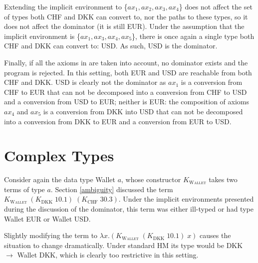 Extending the implicit environment to \{$ax_1,ax_2,ax_3,ax_4$\} does not affect the set of types both CHF and DKK can convert to, nor the paths to these types, so it does not affect the dominator (it is still EUR). Under the assumption that the implicit environment is \{$ax_1,ax_3,ax_4,ax_5$\}, there is once again a single type both CHF and DKK can convert to: USD. As such, USD is the dominator.

Finally, if all the axioms in  are taken into account, no dominator exists and the program is rejected. In this setting, both EUR and USD are reachable from both CHF and DKK. USD is clearly not the dominator as $ax_1$ is a conversion from CHF to EUR that can not be decomposed into a conversion from CHF to USD and a conversion from USD to EUR; neither is EUR: the composition of axioms $ax_4$ and $ax_5$ is a conversion from DKK into USD that can not be decomposed into a conversion from DKK to EUR and a conversion from EUR to USD.


\section{Complex Types}
\label{complex types}
Consider again the data type Wallet $a$, whose constructor \textsc{$K_{\text{Wallet}}$} takes two terms of type $a$. Section \ref{ambiguity} discussed the term \textsc{$K_{\text{Wallet}}\;(K_{\text{DKK}}\;10.1)\;(K_{\text{CHF}}\;30.3)$}. Under the implicit environments presented during the discussion of the dominator, this term was either ill-typed or had type Wallet EUR or Wallet USD.

Slightly modifying the term to \textsc{$\lambda x. (K_{\text{Wallet}}\;(K_{\text{DKK}}\;10.1)\;x)$} causes the situation to change dramatically. Under standard HM its type would be DKK $\to$ Wallet DKK, which is clearly too restrictive in this setting.

